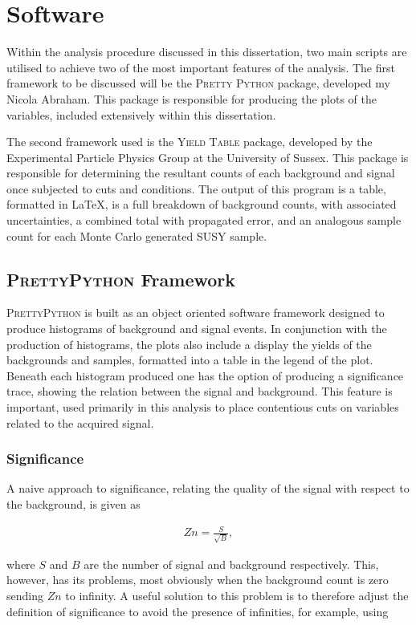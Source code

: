 \section{Software}
Within the analysis procedure discussed in this dissertation, two main scripts are utilised to achieve two of the most important features of the analysis.
The first framework to be discussed will be the P{\scshape retty Python} package, developed my Nicola Abraham.
This package is responsible for producing the plots of the variables, included extensively within this dissertation.

The second framework used is the Y{\scshape ield Table} package, developed by the Experimental Particle Physics Group at the University of Sussex.
This package is responsible for determining the resultant counts of each background and signal once subjected to cuts and conditions.
The output of this program is a table, formatted in \LaTeX, is a full breakdown of background counts, with associated uncertainties, a combined total with propagated error, and an analogous sample count for each Monte Carlo generated SUSY sample.

\subsection{P{\scshape rettyPython} Framework}
P{\scshape rettyPython} is built as an object oriented software framework designed to produce histograms of background and signal events. 
In conjunction with the production of histograms, the plots also include a display the yields of the backgrounds and samples, formatted into a table in the legend of the plot.
Beneath each histogram produced one has the option of producing a significance trace, showing the relation between the signal and background.
This feature is important, used primarily in this analysis to place contentious cuts on variables related to the acquired signal.

\subsubsection{Significance}
A naive approach to significance, relating the quality of the signal with respect to the background, is given as 

\begin{align}
Zn = \frac{S}{\sqrt{B}}, 
\end{align}

\noindent where $S$ and $B$ are the number of signal and background respectively.
This, however, has its problems, most obviously when the background count is zero sending $Zn$ to infinity.
A useful solution to this problem is to therefore adjust the definition of significance to avoid the presence of infinities, for example, using 

